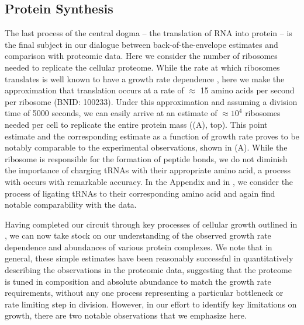 \subsection{Protein Synthesis}
The last process of the central dogma -- the translation of RNA into protein
-- is the final subject in our dialogue between back-of-the-envelope
estimates and comparison with proteomic data. Here we consider the number of
ribosomes needed to replicate the cellular proteome. While the rate at which
ribosomes translates is well known to have a growth rate dependence
\citep{dai2018}, here we make the approximation that translation occurs at a
rate of $\approx$ 15 amino acids per second per ribosome (BNID: 100233).
Under this approximation and assuming a division time of 5000 seconds, we can
easily arrive at an estimate of $\approx 10^4$ ribosomes needed per cell to
replicate the entire protein mass ((A), top). This point
estimate and the corresponding estimate as a function of growth rate
proves to be notably comparable to the experimental observations, shown in
(A). While the ribosome is responsible for the
formation of peptide bonds, we do not diminish the importance of charging
tRNAs with their appropriate amino acid, a process with occurs with
remarkable accuracy. In the Appendix and in
, we consider the process of ligating tRNAs
to their corresponding amino acid and again find notable comparability with
the data.

Having completed our circuit through key processes of cellular growth
outlined in , we can now take stock on our understanding of the
observed growth rate dependence and abundances of various protein complexes. We
note that in general, these simple estimates have been reasonably successful in
quantitatively describing the observations in the proteomic data, suggesting
that the proteome is tuned in composition and absolute abundance to match the
growth rate requirements, without any one process representing a particular
bottleneck or rate limiting step in division. However, in our effort to identify
key limitations on growth, there are two notable observations that we
emphasize here.


